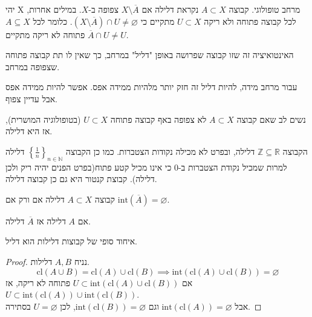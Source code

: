 \documentclass{tstextbook}
\begin{document}
\begin{definition}
יהי X מרחב טופולוגי. קבוצה \(A\subset X\) נקראת דלילה אם \(X\setminus\overline{A}\) צפופה ב-\(X\).
במילים אחרות, לכל קבוצה פתוחה ולא ריקה \(U\subset X\) מתקיים כי \(\left( X\setminus\overline{A} \right)\cap U\ne\varnothing\). כלומר לכל \(A\subseteq X\) פתוחה לא ריקה מתקיים \(\overline{A}\cap U\neq U\).

\end{definition}
\begin{remark}
האינטואיציה זה שזו קבוצה שפרושה באופן "דליל" במרחב, כך שאין לו תת קבוצה פתוחה שצפופה במרחב.

\end{remark}
\begin{remark}
עבור מרחב מידה, להיות דליל זה חזק יותר מלהיות ממידה אפס. אפשר להיות ממידה אפס אבל עדיין צפוף.

\end{remark}
\begin{remark}
נשים לב שאם קבוצה \(A\subset X\) לא צפופה באף קבוצה פתוחה \(U\subset X\) (בטופולוגיה המושרית), אז היא דלילה.

\end{remark}
\begin{example}
הקבוצה \(\mathbb{Z}\subseteq \mathbb{R}\) דלילה, ובפרט לא מכילה נקודות הצטברות. כמו כן הקבוצה \(\left\{  \frac{1}{n}  \right\}_{n \in \mathbb{N}}\) דלילה למרות שמכיל נקודת הצטברות ב-\(0\) כי אינו מכיל קטע פתוח(בפרט הפנים יהיה ריק ולכן דלילה). קבוצת קנטור היא גם כן קבוצה דלילה.

\end{example}
\begin{proposition}
קבוצה \(A\subset X\) דלילה אם ורק אם \(\text{int}\left( \overline{A} \right)=\varnothing\).

\end{proposition}
\begin{corollary}
אם \(A\) דלילה אז \(\overline{A}\) דלילה.

\end{corollary}
\begin{proposition}
איחוד סופי של קבוצות דלילות הוא דליל.

\end{proposition}
\begin{proof}
נניח \(A,B\) דלילות.\\
$$\text{cl}\left( A\cup B \right)=\text{cl}(A)\cup \text{cl}(B)\implies \text{int}\left( \text{cl}(A)\cup \text{cl}(B) \right)=\varnothing$$
אם \(U\subset \text{int}\left( \text{cl}(A)\cup \text{cl}(B) \right)\) פתוחה לא ריקה, אז \(U\subset \text{int}\left( \text{cl}(A) \right)\cup \text{int}\left( \text{cl}(B) \right)\).\\

אבל \(\text{int}\left( \text{cl}(A) \right)=\varnothing\) וגם \(\text{int}\left( \text{cl}(B) \right)=\varnothing\), לכן \(U=\varnothing\) בסתירה.

\end{proof}
\end{document}
